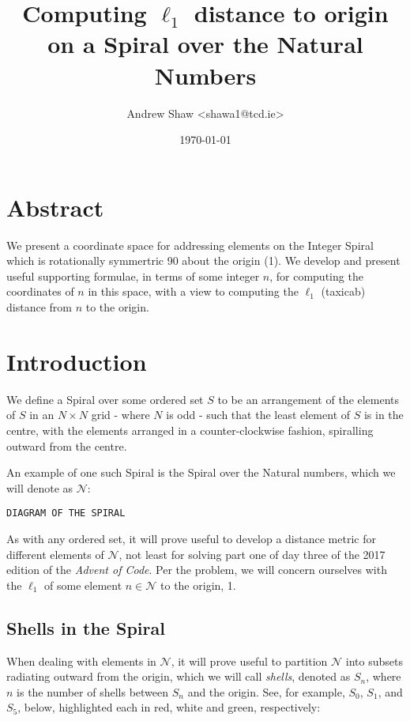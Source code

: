 \documentclass[11pt]{article}
\author{Andrew Shaw <shawa1@tcd.ie>}
\date{\today}
\title{Computing \(\ell_1\) distance to origin on a Spiral over the Natural Numbers}
\begin{document}
\maketitle
\tableofcontents

\section{Abstract}
\label{sec:orga7814cd}
We present a coordinate space for addressing elements on the Integer Spiral
which is rotationally symmertric 90\textdegree{} about the origin (1). We develop and
present useful supporting formulae, in terms of some integer \(n\), for computing
the coordinates of \(n\) in this space, with a view to computing the \(\ell_1\)
(taxicab) distance from \(n\) to the origin.

\section{Introduction}
\label{sec:orge08f20c}
We define a Spiral over some ordered set \(S\) to be an arrangement of the
elements of \(S\) in an \(N \times N\) grid - where \(N\) is odd - such that the least
element of \(S\) is in the centre, with the elements arranged in a
counter-clockwise fashion, spiralling outward from the centre.

An example of one such Spiral is the Spiral over the Natural numbers, which we
will denote as \(\mathcal{N}\):

\begin{verbatim}
DIAGRAM OF THE SPIRAL
\end{verbatim}

As with any ordered set, it will prove useful to develop a distance metric for
different elements of \(\mathcal{N}\), not least for solving part one of day three
of the 2017 edition of the \emph{Advent of Code}. Per the problem, we will concern
ourselves with the \(\ell_1\) of some element \(n \in \mathcal{N}\) to the origin, 1.


\subsection{Shells in the Spiral}
\label{sec:org42624b0}
When dealing with elements in \(\mathcal{N}\), it will prove useful to partition
\(\mathcal{N}\) into subsets radiating outward from the origin, which we will call
\emph{shells}, denoted as \(S_n\), where \(n\) is the number of shells between \(S_n\) and
the origin. See, for example, \(S_0\), \(S_1\), and \(S_5\), below, highlighted each
in red, white and green, respectively:
\end{document}
